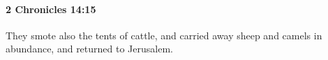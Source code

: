 
		\paragraph{2 Chronicles 14:15} %
			\label{2CHRONICLES-14-15}

			They smote also the tents of cattle, and carried away sheep and camels in abundance, and returned to Jerusalem.

